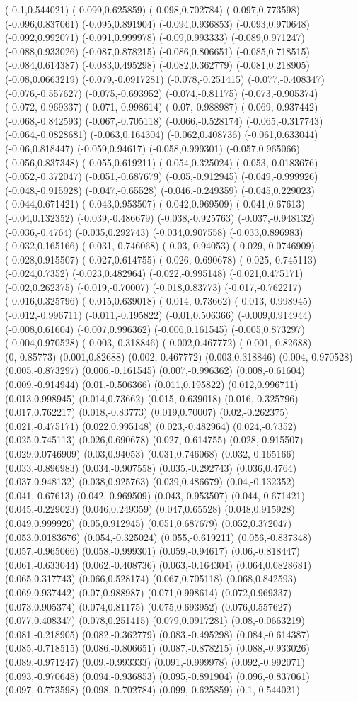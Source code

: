 (-0.1,0.544021) (-0.099,0.625859) (-0.098,0.702784) (-0.097,0.773598) (-0.096,0.837061) (-0.095,0.891904) (-0.094,0.936853) (-0.093,0.970648) (-0.092,0.992071) (-0.091,0.999978) (-0.09,0.993333) (-0.089,0.971247) (-0.088,0.933026) (-0.087,0.878215) (-0.086,0.806651) (-0.085,0.718515) (-0.084,0.614387) (-0.083,0.495298) (-0.082,0.362779) (-0.081,0.218905) (-0.08,0.0663219) (-0.079,-0.0917281) (-0.078,-0.251415) (-0.077,-0.408347) (-0.076,-0.557627) (-0.075,-0.693952) (-0.074,-0.81175) (-0.073,-0.905374) (-0.072,-0.969337) (-0.071,-0.998614) (-0.07,-0.988987) (-0.069,-0.937442) (-0.068,-0.842593) (-0.067,-0.705118) (-0.066,-0.528174) (-0.065,-0.317743) (-0.064,-0.0828681) (-0.063,0.164304) (-0.062,0.408736) (-0.061,0.633044) (-0.06,0.818447) (-0.059,0.94617) (-0.058,0.999301) (-0.057,0.965066) (-0.056,0.837348) (-0.055,0.619211) (-0.054,0.325024) (-0.053,-0.0183676) (-0.052,-0.372047) (-0.051,-0.687679) (-0.05,-0.912945) (-0.049,-0.999926) (-0.048,-0.915928) (-0.047,-0.65528) (-0.046,-0.249359) (-0.045,0.229023) (-0.044,0.671421) (-0.043,0.953507) (-0.042,0.969509) (-0.041,0.67613) (-0.04,0.132352) (-0.039,-0.486679) (-0.038,-0.925763) (-0.037,-0.948132) (-0.036,-0.4764) (-0.035,0.292743) (-0.034,0.907558) (-0.033,0.896983) (-0.032,0.165166) (-0.031,-0.746068) (-0.03,-0.94053) (-0.029,-0.0746909) (-0.028,0.915507) (-0.027,0.614755) (-0.026,-0.690678) (-0.025,-0.745113) (-0.024,0.7352) (-0.023,0.482964) (-0.022,-0.995148) (-0.021,0.475171) (-0.02,0.262375) (-0.019,-0.70007) (-0.018,0.83773) (-0.017,-0.762217) (-0.016,0.325796) (-0.015,0.639018) (-0.014,-0.73662) (-0.013,-0.998945) (-0.012,-0.996711) (-0.011,-0.195822) (-0.01,0.506366) (-0.009,0.914944) (-0.008,0.61604) (-0.007,0.996362) (-0.006,0.161545) (-0.005,0.873297) (-0.004,0.970528) (-0.003,-0.318846) (-0.002,0.467772) (-0.001,-0.82688) (0,-0.85773) (0.001,0.82688) (0.002,-0.467772) (0.003,0.318846) (0.004,-0.970528) (0.005,-0.873297) (0.006,-0.161545) (0.007,-0.996362) (0.008,-0.61604) (0.009,-0.914944) (0.01,-0.506366) (0.011,0.195822) (0.012,0.996711) (0.013,0.998945) (0.014,0.73662) (0.015,-0.639018) (0.016,-0.325796) (0.017,0.762217) (0.018,-0.83773) (0.019,0.70007) (0.02,-0.262375) (0.021,-0.475171) (0.022,0.995148) (0.023,-0.482964) (0.024,-0.7352) (0.025,0.745113) (0.026,0.690678) (0.027,-0.614755) (0.028,-0.915507) (0.029,0.0746909) (0.03,0.94053) (0.031,0.746068) (0.032,-0.165166) (0.033,-0.896983) (0.034,-0.907558) (0.035,-0.292743) (0.036,0.4764) (0.037,0.948132) (0.038,0.925763) (0.039,0.486679) (0.04,-0.132352) (0.041,-0.67613) (0.042,-0.969509) (0.043,-0.953507) (0.044,-0.671421) (0.045,-0.229023) (0.046,0.249359) (0.047,0.65528) (0.048,0.915928) (0.049,0.999926) (0.05,0.912945) (0.051,0.687679) (0.052,0.372047) (0.053,0.0183676) (0.054,-0.325024) (0.055,-0.619211) (0.056,-0.837348) (0.057,-0.965066) (0.058,-0.999301) (0.059,-0.94617) (0.06,-0.818447) (0.061,-0.633044) (0.062,-0.408736) (0.063,-0.164304) (0.064,0.0828681) (0.065,0.317743) (0.066,0.528174) (0.067,0.705118) (0.068,0.842593) (0.069,0.937442) (0.07,0.988987) (0.071,0.998614) (0.072,0.969337) (0.073,0.905374) (0.074,0.81175) (0.075,0.693952) (0.076,0.557627) (0.077,0.408347) (0.078,0.251415) (0.079,0.0917281) (0.08,-0.0663219) (0.081,-0.218905) (0.082,-0.362779) (0.083,-0.495298) (0.084,-0.614387) (0.085,-0.718515) (0.086,-0.806651) (0.087,-0.878215) (0.088,-0.933026) (0.089,-0.971247) (0.09,-0.993333) (0.091,-0.999978) (0.092,-0.992071) (0.093,-0.970648) (0.094,-0.936853) (0.095,-0.891904) (0.096,-0.837061) (0.097,-0.773598) (0.098,-0.702784) (0.099,-0.625859) (0.1,-0.544021) 